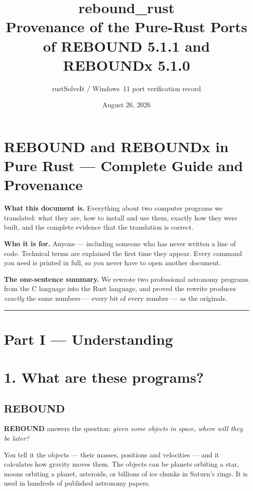 \documentclass[11pt]{article}
\title{\textbf{rebound\_rust} \\[2pt] \large Provenance of the Pure-Rust Ports of
REBOUND 5.1.1 and REBOUNDx 5.1.0}
\author{rustSolveIt / Windows~11 port verification record}
\date{August 26, 2026}
\begin{document}
\maketitle
\tableofcontents
\clearpage
\section{REBOUND and REBOUNDx in Pure Rust --- Complete Guide and Provenance}

\textbf{What this document is.} Everything about two computer programs we translated: what they are, how to install and use them, exactly how they were built, and the complete evidence that the translation is correct.

\textbf{Who it is for.} Anyone --- including someone who has never written a line of code. Technical terms are explained the first time they appear. Every command you need is printed in full, so you never have to open another document.

\textbf{The one-sentence summary.} We rewrote two professional astronomy programs from the C language into the Rust language, and proved the rewrite produces \emph{exactly} the same numbers --- every bit of every number --- as the originals.

\bigskip\hrule\bigskip

\clearpage
\section*{Part I --- Understanding}

\section{1. What are these programs?}

\subsection{REBOUND}

\textbf{REBOUND} answers the question: \emph{given some objects in space, where will they be later?}

You tell it the objects --- their masses, positions and velocities --- and it calculates how gravity moves them. The objects can be planets orbiting a star, moons orbiting a planet, asteroids, or billions of ice chunks in Saturn's rings. It is used in hundreds of published astronomy papers.
\end{document}
